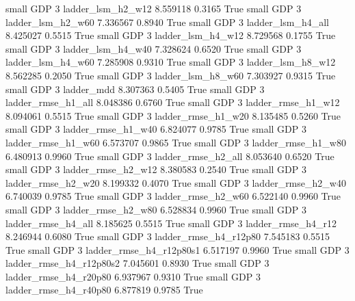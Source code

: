      small      GDP                 3        ladder_lsm_h2_w12   8.559118      0.3165    True
     small      GDP                 3        ladder_lsm_h2_w60   7.336567      0.8940    True
     small      GDP                 3        ladder_lsm_h4_all   8.425027      0.5515    True
     small      GDP                 3        ladder_lsm_h4_w12   8.729568      0.1755    True
     small      GDP                 3        ladder_lsm_h4_w40   7.328624      0.6520    True
     small      GDP                 3        ladder_lsm_h4_w60   7.285908      0.9310    True
     small      GDP                 3        ladder_lsm_h8_w12   8.562285      0.2050    True
     small      GDP                 3        ladder_lsm_h8_w60   7.303927      0.9315    True
     small      GDP                 3               ladder_mdd   8.307363      0.5405    True
     small      GDP                 3       ladder_rmse_h1_all   8.048386      0.6760    True
     small      GDP                 3       ladder_rmse_h1_w12   8.094061      0.5515    True
     small      GDP                 3       ladder_rmse_h1_w20   8.135485      0.5260    True
     small      GDP                 3       ladder_rmse_h1_w40   6.824077      0.9785    True
     small      GDP                 3       ladder_rmse_h1_w60   6.573707      0.9865    True
     small      GDP                 3       ladder_rmse_h1_w80   6.480913      0.9960    True
     small      GDP                 3       ladder_rmse_h2_all   8.053640      0.6520    True
     small      GDP                 3       ladder_rmse_h2_w12   8.380583      0.2540    True
     small      GDP                 3       ladder_rmse_h2_w20   8.199332      0.4070    True
     small      GDP                 3       ladder_rmse_h2_w40   6.740039      0.9785    True
     small      GDP                 3       ladder_rmse_h2_w60   6.522140      0.9960    True
     small      GDP                 3       ladder_rmse_h2_w80   6.528834      0.9960    True
     small      GDP                 3       ladder_rmse_h4_all   8.185625      0.5515    True
     small      GDP                 3       ladder_rmse_h4_r12   8.246944      0.6080    True
     small      GDP                 3    ladder_rmse_h4_r12p80   7.545183      0.5515    True
     small      GDP                 3  ladder_rmse_h4_r12p80s1   6.517197      0.9960    True
     small      GDP                 3  ladder_rmse_h4_r12p80s2   7.045601      0.8930    True
     small      GDP                 3    ladder_rmse_h4_r20p80   6.937967      0.9310    True
     small      GDP                 3    ladder_rmse_h4_r40p80   6.877819      0.9785    True

